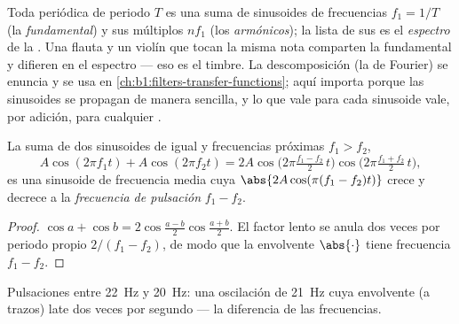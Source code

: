 \begin{remark}[Espectro]\label{rem:b1:wave-propagation:spectrum}
Toda  periódica de periodo $T$ es una suma de sinusoides de
frecuencias $f_1 = 1/T$ (la \emph{fundamental}) y sus múltiplos $nf_1$
(los \emph{armónicos}); la lista de sus  es el \emph{espectro}
de la . Una flauta y un violín que tocan la misma nota comparten la
fundamental y difieren en el espectro --- eso es el timbre. La
descomposición (la de Fourier) se enuncia y se usa en
\cref{ch:b1:filters-transfer-functions}; aquí importa porque las
sinusoides se propagan de manera sencilla, y lo que vale para cada
sinusoide vale, por adición, para cualquier .
\end{remark}

\begin{proposition}[Pulsaciones]\label{prop:b1:wave-propagation:beats}
La suma de dos sinusoides de igual  y frecuencias próximas
$f_1 > f_2$,
\[
A\cos(2\pi f_1 t) + A\cos(2\pi f_2 t)
= 2A\cos\!\big(2\pi\tfrac{f_1 - f_2}{2}\,t\big)\cos\!\big(2\pi\tfrac{f_1 + f_2}{2}\,t\big),
\]
es una sinusoide de frecuencia media cuya 
$\abs{2A\cos(\pi(f_1 - f_2)t)}$ crece y decrece a la \emph{frecuencia de
pulsación} $f_1 - f_2$.
\end{proposition}

\begin{proof}
$\cos a + \cos b = 2\cos\frac{a - b}{2}\cos\frac{a + b}{2}$. El factor
lento se anula dos veces por periodo propio $2/(f_1 - f_2)$, de modo que
la envolvente $\abs{\cdot}$ tiene frecuencia $f_1 - f_2$.
\end{proof}

\begin{omfigure}

{\small Pulsaciones entre \qty{22}{Hz} y \qty{20}{Hz}: una oscilación de
\qty{21}{Hz} cuya envolvente (a trazos) late dos veces por segundo --- la
diferencia de las frecuencias.}
\end{omfigure}

